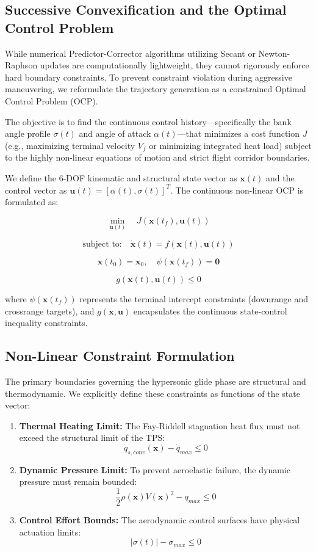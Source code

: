 \documentclass[11pt,a4paper]{article}
\theoremstyle{definition}
\numberwithin{equation}{section}
\begin{document}
\subsection{Successive Convexification and the Optimal Control Problem}
While numerical Predictor-Corrector algorithms utilizing Secant or Newton-Raphson updates are computationally lightweight, they cannot rigorously enforce hard boundary constraints. To prevent constraint violation during aggressive maneuvering, we reformulate the trajectory generation as a constrained Optimal Control Problem (OCP).

The objective is to find the continuous control history—specifically the bank angle profile $\sigma(t)$ and angle of attack $\alpha(t)$—that minimizes a cost function $J$ (e.g., maximizing terminal velocity $V_f$ or minimizing integrated heat load) subject to the highly non-linear equations of motion and strict flight corridor boundaries.

We define the 6-DOF kinematic and structural state vector as $\mathbf{x}(t)$ and the control vector as $\mathbf{u}(t) = [\alpha(t), \sigma(t)]^T$. The continuous non-linear OCP is formulated as:

$$\min_{\mathbf{u}(t)} \quad J(\mathbf{x}(t_f), \mathbf{u}(t))$$

$$\text{subject to:} \quad \dot{\mathbf{x}}(t) = f(\mathbf{x}(t), \mathbf{u}(t))$$

$$\mathbf{x}(t_0) = \mathbf{x}_0, \quad \psi(\mathbf{x}(t_f)) = \mathbf{0}$$

$$g(\mathbf{x}(t), \mathbf{u}(t)) \le 0$$

where $\psi(\mathbf{x}(t_f))$ represents the terminal intercept constraints (downrange and crossrange targets), and $g(\mathbf{x}, \mathbf{u})$ encapsulates the continuous state-control inequality constraints.

\subsection{Non-Linear Constraint Formulation}
The primary boundaries governing the hypersonic glide phase are structural and thermodynamic. We explicitly define these constraints as functions of the state vector:

\begin{enumerate}
    \item \textbf{Thermal Heating Limit:} The Fay-Riddell stagnation heat flux must not exceed the structural limit of the TPS: $$\dot{q}_{s, conv}(\mathbf{x}) - \dot{q}_{max} \le 0$$
    \item \textbf{Dynamic Pressure Limit:} To prevent aeroelastic failure, the dynamic pressure must remain bounded: $$\frac{1}{2} \rho(\mathbf{x}) V(\mathbf{x})^2 - q_{max} \le 0$$
    \item \textbf{Control Effort Bounds:} The aerodynamic control surfaces have physical actuation limits: $$\vert{}\sigma(t)\vert{} - \sigma_{max} \le 0$$
\end{enumerate}
\end{document}
